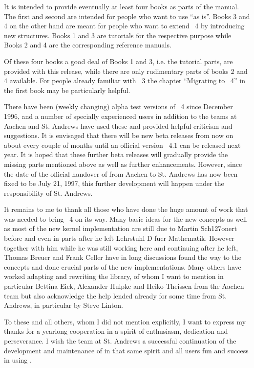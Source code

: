 It is intended to provide eventually at least four  books as parts of the
manual. The  first and second  are intended for  people  who want  to use
{\GAP} ``as is''.  Books 3 and 4  on the other hand  are meant for people
who want to extend {\GAP}~4 by introducing new structures.  Books 1 and 3
are  tutorials for the respective   purpose while Books  2 and  4 are the
corresponding reference manuals.

Of these four books a  good deal  of Books 1   and 3, i.e.  the  tutorial
parts, are provided with  this release, while  there are only rudimentary
parts  of books  2  and 4  available.   For people  already familiar with
{\GAP}~3 the chapter ``Migrating  to {\GAP}~4'' in the  first book may be
particularly helpful.

There have been (weekly  changing) alpha test versions  of {\GAP}~4 since
December  1996, and a number   of specially experienced  {\GAP} users  in
addition to  the {\GAP} teams at Aachen  and St.  Andrews have used these
and   provided helpful criticism and  suggestions.   It is envisaged that
there will be new beta releases from now on about  every couple of months
until an  official version  {\GAP}~4.1 can be released  next year.  It is
hoped that these further beta releases will gradually provide the missing
parts mentioned above as well as further enhancements. However, since the
date of the official  handover of {\GAP} from  Aachen to St.  Andrews has
now been fixed to be July 21, 1997, this  further development will happen
under the responsibility of St. Andrews.

It remains to me to thank all those who have done the huge amount of work
that was needed to  bring {\GAP}~4 on its way.   Many basic ideas for the
new concepts as well as  most of the  new kernel implementation are still
due to Martin  Sch\accent127onert before and  even in parts after he left
Lehrstuhl D  fuer Mathematik.  However  together with   him while he  was
still working here and continuing after he left,  Thomas Breuer and Frank
Celler have in  long discussions found the  way to the  concepts and done
crucial  parts  of  the new  implementations.   Many   others have worked
adapting and rewriting    the library, of   whom I  want   to mention  in
particular  Bettina Eick, Alexander Hulpke   and Heiko Theissen from  the
Aachen team  but also acknowledge the  help lended already for  some time
from St.  Andrews, in particular by Steve Linton.

To these and all others,  whom I did  not  mention explicitly, I want  to
express my  thanks for a yearlong  cooperation in a spirit of enthusiasm,
dedication and perseverance.     I wish   the team  at    St.  Andrews  a
successful continuation  of the development and  maintenance of {\GAP} in
that same spirit and all users fun and success in using {\GAP}.

